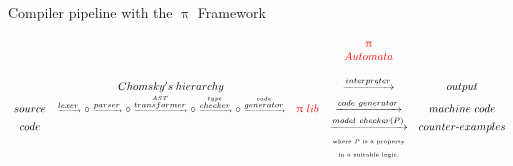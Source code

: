 \documentclass{beamer}
\begin{document}
\begin{frame}[shrink]{Compiler pipeline with the {\color{red}$\uppi$ Framework}}

\begin{adjustbox}{width=\textwidth,center}
$\begin{array}{ccccccccc}
             &                                                                                                                                                                                                                                                                                             &               &  \color{red}{\uppi} & \\
	     &                                                                                                                                                                                                                                                                                             &               &  \color{red}{Automata} & \\ \\
	     &                                                                           {\tiny Chomsky's \ hierarchy}                                                                                                                                                                                                                  &               &  \xrightarrow{interpreter} & output \\     
source  & {\tiny \xrightarrow{lexer} \circ \xrightarrow{parser}  \circ \xrightarrow{\stackrel{AST}{transformer}} \circ \xrightarrow{\stackrel{type}{checker}} \circ \xrightarrow{\stackrel{code}{generator}}} & \color{red}{\uppi \ lib} & \xrightarrow{code \ generator} & machine \ code \\
code             &                                                                                                                                                                                                                                                                                            &                 & \xrightarrow{model \ checker(P)} & counter\mbox{-}examples  \\
            &                                                                                                                                                                                                                                                                                             &                 & \text{\tiny where $P$ is a property}        &    \\
            &                                                                                                                                                                                                                                                                                             &                 & \text{\tiny in a suitable logic.}        &   \\           
\end{array}$
\end{adjustbox}


\end{frame}
\end{document}
